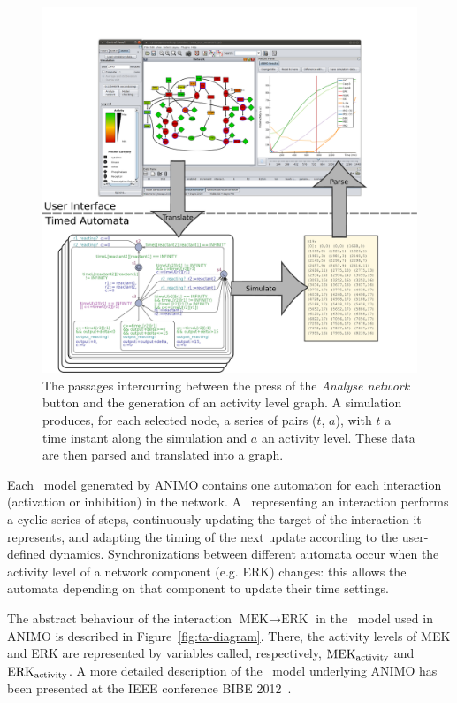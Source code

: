 \begin{figure}[htb]
\begin{minipage}{\textwidth}
  \includegraphics[width=\textwidth]{images/animo_simulation_workflow}
\caption{The passages intercurring between the press of the \emph{Analyse network} button
and the generation of an activity level graph.
A simulation produces, for each selected node, a series of pairs {\sf ($t$, $a$)},
with $t$ a time instant along the simulation and $a$ an activity level. These data are
then parsed and translated into a graph.}\label{fig:animo-sim-workflow}
\end{minipage}
\end{figure}

Each \tas\ model generated by ANIMO contains one automaton for each interaction (activation or inhibition) in the network.
A \ta\ representing an interaction performs a cyclic series of steps, continuously updating
the target of the interaction it represents, and adapting the timing of the next update according to
the user-defined dynamics. Synchronizations between different automata occur when the activity level of a network component (e.g. ERK)
changes: this allows the automata depending on that component to update their time settings.

The abstract behaviour of the interaction $\mbox{MEK} \rightarrow \mbox{ERK}$ in the \tas\ model used in ANIMO is described in Figure~\ref{fig:ta-diagram}.
There, the activity levels of MEK and ERK are represented by variables called, respectively, $\mbox{MEK}_{\mbox{\scriptsize activity}}$
and $\mbox{ERK}_{\mbox{\scriptsize activity}}$. A more detailed description of the \tas\ model underlying ANIMO has been presented
at the IEEE conference BIBE 2012~\citep{animo-bibe}.


